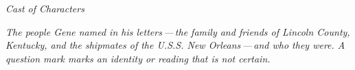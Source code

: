 
\cleardoublepage
\thispagestyle{laempty}
\vspace*{0.12\textheight}
\begin{center}
    \par
    \vspace{0.4em}
    \brassrule[36pt]\par
    \vspace{1.6em}
    {\Huge\displayfont\itshape Cast of Characters\par}
    \vspace{1.6em}
    \begin{minipage}{0.78\textwidth}
        \centering\displayfont\itshape\large\color{walnutsoft}
        The people Gene named in his letters\,---\,the family and friends of
        Lincoln County, Kentucky, and the shipmates of the U.S.S. New
        Orleans\,---\,and who they were. A question mark marks an identity or
        reading that is not certain.
    \end{minipage}
\end{center}
\vfill
\cleardoublepage


